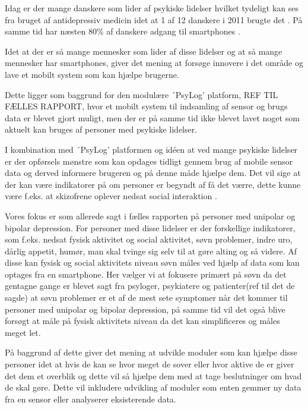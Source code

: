 Idag er der mange danskere som lider af psykiske lidelser hvilket tydeligt kan ses fra bruget af antidepressiv medicin idet at 1 af 12 danskere i 2011 brugte det \citep{misc:forbrugAntidepressiva}. 
På samme tid har næsten 80\% af danskere adgang til smartphones \citep{misc:dstElektronik}.

Idet at der er så mange mennesker som lider af disse lidelser og at så mange mennesker har smartphones, giver det mening at forsøge innovere i det område og lave et mobilt system som kan hjælpe brugerne.

Dette ligger som baggrund for den modulære ´PsyLog' platform, REF TIL FÆLLES RAPPORT, hvor et mobilt system til indsamling af sensor og brugs data er blevet gjort muligt, men der er på samme tid ikke blevet lavet noget som aktuelt kan bruges af personer med psykiske lidelser.

I kombination med ´PsyLog' platformen og idéen at ved mange psykiske lidelser er der opførsels mønstre som kan opdages tidligt gennem brug af mobile sensor data og derved informere brugeren og på denne måde hjælpe dem. 
Det vil sige at der kan være indikatorer på om personer er begyndt af få det værre, dette kunne være f.eks. at skizofrene oplever nedsat social interaktion \citep{misc:negativeSymptomsSchizo}.

Vores fokus er som allerede sagt i fælles rapporten på personer med unipolar og bipolar depression. 
For personer med disse lidelser er der forskellige indikatorer, som f.eks. nedsat fysisk aktivitet og social aktivitet, søvn problemer, indre uro, dårlig appetit, humør, man skal tvinge sig selv til at gøre alting og så videre. %
Af disse kan fysisk og social aktivitets niveau søvn måles ved hjælp af data som kan optages fra en smartphone. 
Her vælger vi at fokusere primært på søvn da det gentagne gange er blevet sagt fra psyloger, psykiatere og patienter(ref til det de sagde) at søvn problemer er et af de mest sete symptomer når det kommer til personer med unipolar og bipolar depression, på samme tid vil det også blive forsøgt at måle på fysisk aktivitets niveau da det kan simplificeres og måles meget let.

På baggrund af dette giver det mening at udvikle moduler som kan hjælpe disse personer idet at hvis de kan se hvor meget de sover eller hvor aktive de er giver det dem et overblik og dette vil så hjælpe dem med at tage beslutninger om hvad de skal gøre. 
Dette vil inkludere udvikling af moduler som enten gemmer ny data fra en sensor eller analyserer eksisterende data.